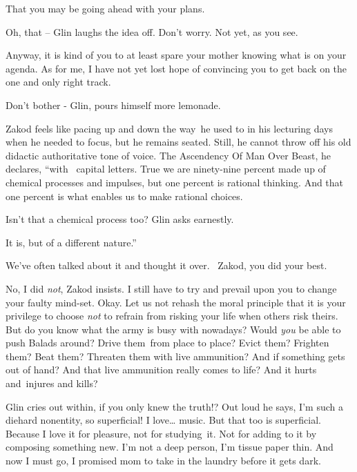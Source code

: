 \documentclass[letterpaper]{article}
\begin{document}
{\textquotedbl}That you may be going ahead with your plans.{\textquotedbl} 

{\textquotedbl}Oh, that -- {\textquotedbl} Glin laughs the idea off. {\textquotedbl}Don't worry. Not yet, as you
see.{\textquotedbl} 

{\textquotedbl}Anyway, it is kind of you to at least spare your mother knowing what is on your agenda. As for me, I have
not yet lost hope of convincing you to get back on the one and only right track.{\textquotedbl} 

{\textquotedbl}Don't bother -{\textquotedbl} Glin, pours himself more lemonade. 

Zakod feels like pacing up and down the way~he used to in his lecturing days when he needed to focus, but he remains
seated. Still, he cannot throw off his old didactic authoritative tone of voice. {\textquotedbl}The Ascendency Of Man
Over Beast,{\textquotedbl} he declares, ``with \ capital letters. True we are ninety-nine percent made up of chemical
processes and impulses, but one percent is rational thinking. And that one percent is what enables us to make rational
choices.{\textquotedbl} 

{\textquotedbl}Isn't that a chemical process too?{\textquotedbl} Glin asks\textcolor[rgb]{0.0,0.4392157,0.7529412}{
}earnestly. 

{\textquotedbl}It is, but of a different nature.'' 

{\textquotedbl}We've often talked about it and thought it over. \ Zakod, you did your best.{\textquotedbl} 

{\textquotedbl}No, I did \textit{not},{\textquotedbl} Zakod insists. {\textquotedbl}I still have to try and prevail upon
you to change your faulty mind-set. Okay. Let us not rehash the moral principle that it is your privilege to choose
\textit{not} to refrain from risking your life when others risk theirs. But do you know what the army is busy with
nowadays? Would \textit{you} be able to push Balads around? Drive them~from place to place? Evict them? Frighten them?
Beat them? Threaten them with live ammunition? And if something gets out of hand? And that live ammunition really comes
to life? And it hurts and~injures and kills?{\textquotedbl} 

Glin cries out within, if you only knew the truth!? Out loud he says, {\textquotedbl}I'm such a diehard nonentity, so
superficial! I love{\dots} music. But that too is superficial. Because I love it for pleasure, not for studying~it. Not
for adding to it by composing something new. I'm not a deep person, I'm tissue paper thin. And now I must go, I
promised mom to take in the laundry before it gets dark.{\textquotedbl} 
\end{document}
